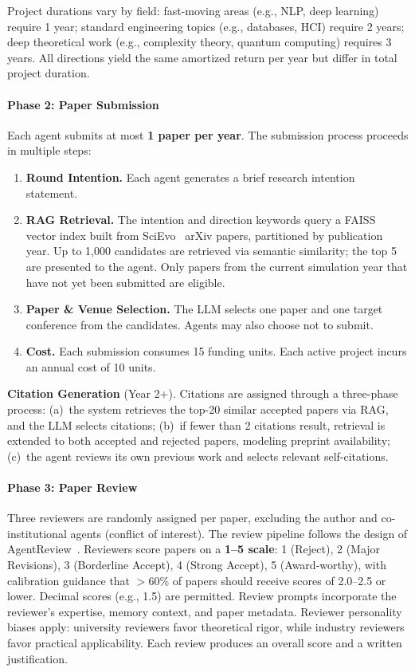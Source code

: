 \documentclass{article}
\begin{document}
Project durations vary by field: fast-moving areas (e.g., NLP, deep learning) require 1 year; standard engineering topics (e.g., databases, HCI) require 2 years; deep theoretical work (e.g., complexity theory, quantum computing) requires 3 years. All directions yield the same amortized return per year but differ in total project duration.


\paragraph{Phase 2: Paper Submission}

Each agent submits at most \textbf{1 paper per year}. The submission process proceeds in multiple steps:

\begin{enumerate}
    \item \textbf{Round Intention.} Each agent generates a brief research intention statement.
    \item \textbf{RAG Retrieval.} The intention and direction keywords query a FAISS vector index built from SciEvo~\cite{jin2024scievo} arXiv papers, partitioned by publication year. Up to 1{,}000 candidates are retrieved via semantic similarity; the top 5 are presented to the agent. Only papers from the current simulation year that have not yet been submitted are eligible.
    \item \textbf{Paper \& Venue Selection.} The LLM selects one paper and one target conference from the candidates. Agents may also choose not to submit.
    \item \textbf{Cost.} Each submission consumes 15 funding units. Each active project incurs an annual cost of 10 units.
\end{enumerate}

\noindent \textbf{Citation Generation} (Year 2+). Citations are assigned through a three-phase process: (a)~the system retrieves the top-20 similar accepted papers via RAG, and the LLM selects citations; (b)~if fewer than 2 citations result, retrieval is extended to both accepted and rejected papers, modeling preprint availability; (c)~the agent reviews its own previous work and selects relevant self-citations.


\paragraph{Phase 3: Paper Review}

Three reviewers are randomly assigned per paper, excluding the author and co-institutional agents (conflict of interest). The review pipeline follows the design of AgentReview~\citep{jin2024agentreview}. Reviewers score papers on a \textbf{1--5 scale}: 1 (Reject), 2 (Major Revisions), 3 (Borderline Accept), 4 (Strong Accept), 5 (Award-worthy), with calibration guidance that $>$60\% of papers should receive scores of 2.0--2.5 or lower. Decimal scores (e.g., 1.5) are permitted. Review prompts incorporate the reviewer's expertise, memory context, and paper metadata. Reviewer personality biases apply: university reviewers favor theoretical rigor, while industry reviewers favor practical applicability. Each review produces an overall score and a written justification.
\end{document}

